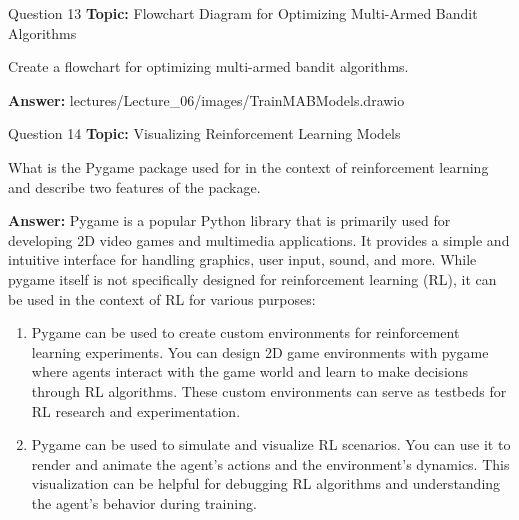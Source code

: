 \begin{frame}{Question 13}
    \textbf{Topic:} Flowchart Diagram for Optimizing Multi-Armed Bandit Algorithms
    \vspace{10pt}

    Create a flowchart for optimizing multi-armed bandit algorithms. 
    \vspace{20pt}

    \textbf{Answer:} lectures/Lecture\_06/images/TrainMABModels.drawio
\end{frame}

\begin{frame}{Question 14}
    \textbf{Topic:} Visualizing Reinforcement Learning Models
    \vspace{10pt}

    What is the Pygame package used for in the context of reinforcement learning and describe two features of the package. 
    \vspace{20pt}

    \textbf{Answer:}
    Pygame is a popular Python library that is primarily used for developing 2D video games and multimedia applications. It provides a simple and intuitive interface for handling graphics, user input, sound, and more. While pygame itself is not specifically designed for reinforcement learning (RL), it can be used in the context of RL for various purposes:
\end{frame}
\begin{frame}
    \begin{enumerate}
        \item Pygame can be used to create custom environments for reinforcement learning experiments. You can design 2D game environments with pygame where agents interact with the game world and learn to make decisions through RL algorithms. These custom environments can serve as testbeds for RL research and experimentation.
        \item Pygame can be used to simulate and visualize RL scenarios. You can use it to render and animate the agent's actions and the environment's dynamics. This visualization can be helpful for debugging RL algorithms and understanding the agent's behavior during training.
    \end{enumerate}
    
\end{frame}
